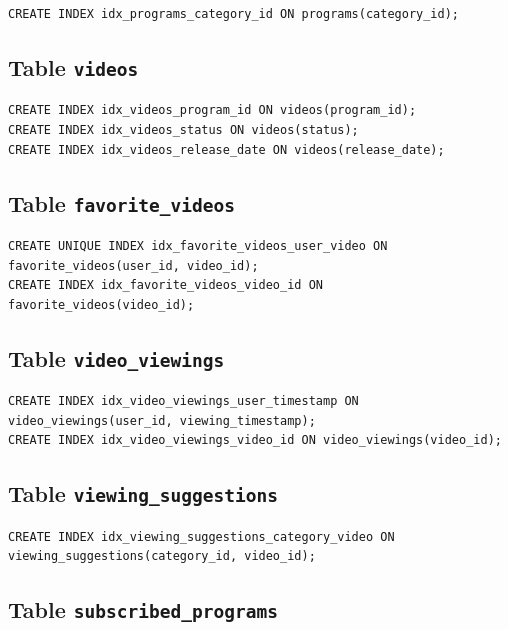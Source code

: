 \documentclass[a4paper,12pt]{article}
\begin{document}
\begin{lstlisting}
CREATE INDEX idx_programs_category_id ON programs(category_id);
\end{lstlisting}

\subsection{Table \texttt{videos}}

\begin{lstlisting}
CREATE INDEX idx_videos_program_id ON videos(program_id);
CREATE INDEX idx_videos_status ON videos(status);
CREATE INDEX idx_videos_release_date ON videos(release_date);
\end{lstlisting}

\subsection{Table \texttt{favorite\_videos}}

\begin{lstlisting}
CREATE UNIQUE INDEX idx_favorite_videos_user_video ON favorite_videos(user_id, video_id);
CREATE INDEX idx_favorite_videos_video_id ON favorite_videos(video_id);
\end{lstlisting}

\subsection{Table \texttt{video\_viewings}}

\begin{lstlisting}
CREATE INDEX idx_video_viewings_user_timestamp ON video_viewings(user_id, viewing_timestamp);
CREATE INDEX idx_video_viewings_video_id ON video_viewings(video_id);
\end{lstlisting}

\subsection{Table \texttt{viewing\_suggestions}}

\begin{lstlisting}
CREATE INDEX idx_viewing_suggestions_category_video ON viewing_suggestions(category_id, video_id);
\end{lstlisting}

\subsection{Table \texttt{subscribed\_programs}}
\end{document}
